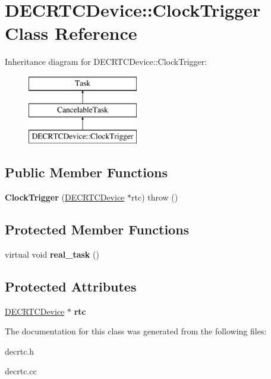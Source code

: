 \hypertarget{classDECRTCDevice_1_1ClockTrigger}{
\section{DECRTCDevice::ClockTrigger Class Reference}
\label{classDECRTCDevice_1_1ClockTrigger}
}
Inheritance diagram for DECRTCDevice::ClockTrigger:\begin{figure}[H]
\begin{center}
\leavevmode
\includegraphics[height=3cm]{classDECRTCDevice_1_1ClockTrigger}
\end{center}
\end{figure}
\subsection*{Public Member Functions}
\begin{DoxyCompactItemize}
\item 
\hypertarget{classDECRTCDevice_1_1ClockTrigger_a91c8934e9b88f924764d8c36d9650b67}{
{\bfseries ClockTrigger} (\hyperlink{classDECRTCDevice}{DECRTCDevice} $\ast$rtc)  throw ()}
\label{classDECRTCDevice_1_1ClockTrigger_a91c8934e9b88f924764d8c36d9650b67}

\end{DoxyCompactItemize}
\subsection*{Protected Member Functions}
\begin{DoxyCompactItemize}
\item 
\hypertarget{classDECRTCDevice_1_1ClockTrigger_a0b2b3ae399edded5e6ac181dd6d7c66e}{
virtual void {\bfseries real\_\-task} ()}
\label{classDECRTCDevice_1_1ClockTrigger_a0b2b3ae399edded5e6ac181dd6d7c66e}

\end{DoxyCompactItemize}
\subsection*{Protected Attributes}
\begin{DoxyCompactItemize}
\item 
\hypertarget{classDECRTCDevice_1_1ClockTrigger_aeabc70cadfac9cabaa7d353c2befd3b4}{
\hyperlink{classDECRTCDevice}{DECRTCDevice} $\ast$ {\bfseries rtc}}
\label{classDECRTCDevice_1_1ClockTrigger_aeabc70cadfac9cabaa7d353c2befd3b4}

\end{DoxyCompactItemize}


The documentation for this class was generated from the following files:\begin{DoxyCompactItemize}
\item 
decrtc.h\item 
decrtc.cc\end{DoxyCompactItemize}
